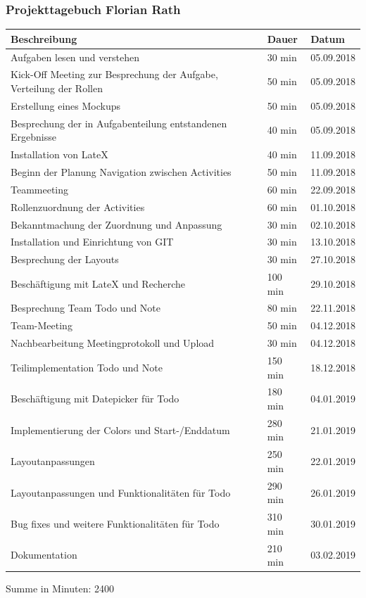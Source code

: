 \subsubsection{Projekttagebuch Florian Rath}
\begin{longtable}{|p{10cm}|p{2cm}|p{2cm}|}
\hline
{\textbf{Beschreibung}} & {\textbf{Dauer}} & {\textbf{Datum}} \\ \hline
Aufgaben lesen und verstehen & 30 min & 05.09.2018\\ \hline 
Kick-Off Meeting zur Besprechung der Aufgabe, Verteilung der Rollen & 50 min & 05.09.2018\\ \hline 
Erstellung eines Mockups & 50 min & 05.09.2018\\ \hline 
Besprechung der in Aufgabenteilung entstandenen Ergebnisse & 40 min & 05.09.2018\\ \hline 
Installation von LateX & 40 min & 11.09.2018\\ \hline 
Beginn der Planung Navigation zwischen Activities & 50 min & 11.09.2018\\ \hline 
Teammeeting & 60 min & 22.09.2018\\ \hline 
Rollenzuordnung der Activities & 60 min & 01.10.2018\\ \hline 
Bekanntmachung der Zuordnung und Anpassung & 30 min & 02.10.2018\\ \hline 
Installation und Einrichtung von GIT & 30 min & 13.10.2018\\ \hline 
Besprechung der Layouts & 30 min & 27.10.2018\\ \hline 
Beschäftigung mit LateX und Recherche & 100 min & 29.10.2018\\ \hline 
Besprechung Team Todo und Note & 80 min & 22.11.2018\\ \hline 
Team-Meeting & 50 min & 04.12.2018\\ \hline 
Nachbearbeitung Meetingprotokoll und Upload & 30 min & 04.12.2018\\ \hline 
Teilimplementation Todo und Note & 150 min & 18.12.2018\\ \hline 
Beschäftigung mit Datepicker für Todo & 180 min & 04.01.2019\\ \hline 
Implementierung der Colors und Start-/Enddatum & 280 min & 21.01.2019\\ \hline 
Layoutanpassungen & 250 min & 22.01.2019\\ \hline 
Layoutanpassungen und Funktionalitäten für Todo & 290 min & 26.01.2019\\ \hline 
Bug fixes und weitere Funktionalitäten für Todo & 310 min & 30.01.2019\\ \hline 
Dokumentation & 210 min & 03.02.2019\\ \hline 
\end{longtable}
Summe in Minuten: 2400

